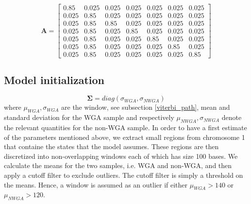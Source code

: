\begin{equation}
\mathbf{A} = \begin{bmatrix}0.85 & 0.025 & 0.025 & 0.025 & 0.025 & 0.025 & 0.025 \\ 

0.025 & 0.85 & 0.025 & 0.025 & 0.025 & 0.025 & 0.025 \\
0.025 & 0.85 & 0.85 & 0.025 & 0.025 & 0.025 & 0.025 \\
0.025 & 0.85 & 0.025 & 0.85 & 0.025 & 0.025 & 0.025 \\
0.025 & 0.85 & 0.025 & 0.025 & 0.85 & 0.025 & 0.025 \\
0.025 & 0.85 & 0.025 & 0.025 & 0.025 & 0.85 & 0.025 \\
0.025 & 0.85 & 0.025 & 0.025 & 0.025 & 0.025 & 0.85 
\end{bmatrix}
\label{initial_A}
\end{equation}



 

\subsection{Model initialization}
\label{model_initialization}





\begin{equation}
\boldsymbol{\Sigma} = diag(\sigma_{WGA}, \sigma_{NWGA})
\end{equation}
where $\mu_{WGA}, \sigma_{WGA}$ are the window, see subsection \ref{viterbi_path}, mean and standard  deviation for the WGA sample and respectively $\mu_{NWGA}, \sigma_{NWGA}$ denote the relevant quantities for the non-WGA sample. In order to have a first estimate of the parameters mentioned above, we extract small regions from chromosome 1 that containe the states that the model assumes. These regions are then discretized into non-overlapping windows each of which has size 100 bases.  We calculate the means for the two samples, i.e. WGA and non-WGA, and then apply a cutoff filter to exclude outliers. The cutoff filter is simply a threshold on the means. Hence, a window is assumed as an outlier if either $\mu_{WGA} > 140$ or $\mu_{NWGA} > 120$.  

